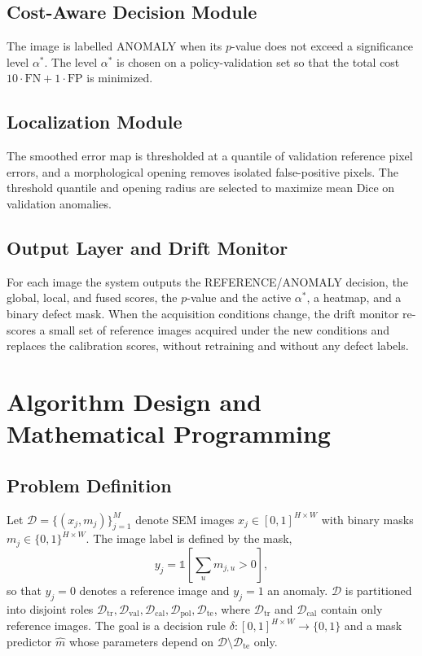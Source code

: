 \documentclass[conference]{IEEEtran}
\begin{document}
\subsection{Cost-Aware Decision Module}
The image is labelled ANOMALY when its $p$-value does not exceed a significance level $\alpha^*$. The level $\alpha^*$ is chosen on a policy-validation set so that the total cost $10\cdot\mathrm{FN}+1\cdot\mathrm{FP}$ is minimized.

\subsection{Localization Module}
The smoothed error map is thresholded at a quantile of validation reference pixel errors, and a morphological opening removes isolated false-positive pixels. The threshold quantile and opening radius are selected to maximize mean Dice on validation anomalies.

\subsection{Output Layer and Drift Monitor}
For each image the system outputs the REFERENCE/ANOMALY decision, the global, local, and fused scores, the $p$-value and the active $\alpha^*$, a heatmap, and a binary defect mask. When the acquisition conditions change, the drift monitor re-scores a small set of reference images acquired under the new conditions and replaces the calibration scores, without retraining and without any defect labels.

\section{Algorithm Design and Mathematical Programming}
\subsection{Problem Definition}
Let $\mathcal{D}=\{(x_j,m_j)\}_{j=1}^{M}$ denote SEM images $x_j\in[0,1]^{H\times W}$ with binary masks $m_j\in\{0,1\}^{H\times W}$. The image label is defined by the mask,
\begin{equation}
y_j=\mathbb{1}\!\left[\textstyle\sum_{u} m_{j,u}>0\right],
\end{equation}
so that $y_j=0$ denotes a reference image and $y_j=1$ an anomaly. $\mathcal{D}$ is partitioned into disjoint roles $\mathcal{D}_{\mathrm{tr}},\mathcal{D}_{\mathrm{val}},\mathcal{D}_{\mathrm{cal}},\mathcal{D}_{\mathrm{pol}},\mathcal{D}_{\mathrm{te}}$, where $\mathcal{D}_{\mathrm{tr}}$ and $\mathcal{D}_{\mathrm{cal}}$ contain only reference images. The goal is a decision rule $\delta:[0,1]^{H\times W}\to\{0,1\}$ and a mask predictor $\hat m$ whose parameters depend on $\mathcal{D}\setminus\mathcal{D}_{\mathrm{te}}$ only.
\end{document}
